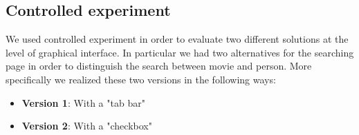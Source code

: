 \documentclass[12pt, a4paper]{article}
\numberwithin{figure}{section}
\begin{document}
\subsection{Controlled experiment}


We used  controlled experiment in order to evaluate two different solutions at the level of graphical interface. 
In particular we had two alternatives for the searching page in order to distinguish the search between
movie and person. 
More specifically we realized these two versions in the following ways:
\begin{itemize}
	\item \textbf{Version 1}: With a "tab bar" 
	\item \textbf{Version 2}: With a "checkbox"
\end{itemize}
\end{document}
